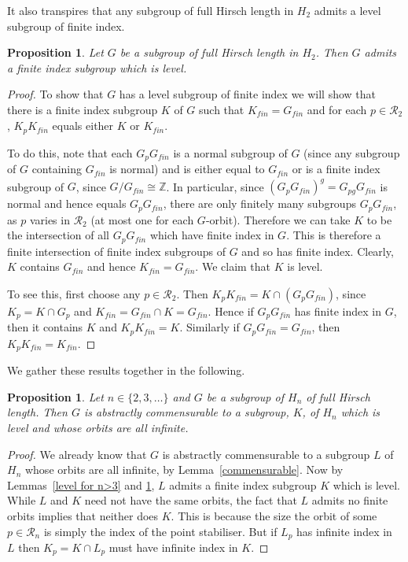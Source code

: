 \documentclass[11pt,a4paper]{amsart}
\newtheorem{proposition}[theorem]{Proposition}
\theoremstyle{definition}
\theoremstyle{remark}
\newcommand{\Z}{\mathbb Z}
\newcommand{\Ra}{\mathcal{R}}
\newcommand{\gfin}{G_{\textit{fin}}}
\newcommand{\kfin}{K_{\textit{fin}}}
\begin{document}
It also transpires that any subgroup of full Hirsch length in $H_2$ admits a level subgroup of finite index. 

\begin{proposition}
	\label{level for n=2}
	Let $G$ be a subgroup of full Hirsch length in $H_2$. Then $G$ admits a finite index subgroup which is level.  
\end{proposition}
\begin{proof} To show that $G$ has a level subgroup of finite index we will show that there is a finite index subgroup $K$ of $G$ such that $\kfin = \gfin$ and for each $p \in \Ra_2$, $K_p \kfin$ equals either $K$ or $\kfin$. 
	
	
	To do this, note that each $G_p\gfin$ is a normal subgroup of $G$ (since any subgroup of $G$ containing $\gfin$ is normal) and is either equal to $\gfin$ or is a finite index subgroup of $G$, since $G/\gfin \cong \Z$. In particular, since $(G_p \gfin)^g = G_{pg} \gfin$ is normal and hence equals $G_p \gfin$, there are only finitely many subgroups $G_p  \gfin$, as $p$ varies in $\Ra_2$ (at most one for each $G$-orbit). Therefore we can take $K$ to be the intersection of all $G_p \gfin$ which have finite index in $G$. This is therefore a finite intersection of finite index subgroups of $G$ and so has finite index. Clearly, $K$ contains $\gfin$ and hence $\kfin = \gfin$. We claim that $K$ is level. 
	
	
	 To see this, first choose any $p \in \Ra_2$. Then $K_p \kfin = K \cap (G_p \gfin)$, since $K_p = K \cap G_p$ and $\kfin=\gfin \cap K = \gfin$. Hence if $G_p \gfin$ has finite index in $G$, then it contains $K$ and $K_p \kfin=K$. Similarly if $G_p \gfin = \gfin$, then  $K_p \kfin=\kfin$. 
\end{proof}

We gather these results together in the  following.

\begin{proposition}\label{level and inforbs}
	Let $n\in \{2, 3, \ldots\}$ and $G$ be a subgroup of $H_n$ of full Hirsch length. Then $G$ is abstractly commensurable to a subgroup, $K$, of $H_n$ which is level and whose orbits are all infinite. 
\end{proposition}
\begin{proof}
	We already know that $G$ is abstractly commensurable to a subgroup $L$ of $H_n$ whose orbits are all infinite, by Lemma~\ref{commensurable}. Now by Lemmas~\ref{level for n>3} and \ref{level for n=2}, $L$ admits a finite index subgroup $K$ which is level. While $L$ and $K$ need not have the same orbits, the fact that $L$ admits no finite orbits implies that neither does $K$. This is because the size the orbit of some $p \in \Ra_n$ is simply the index of the point stabiliser. But if $L_p$ has infinite index in $L$ then $K_p = K \cap L_p$ must have infinite index in $K$. 
\end{proof}
\end{document}
